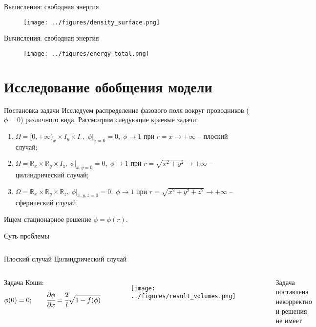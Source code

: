 \documentclass[aspectratio=169]{beamer}
\begin{document}
\begin{frame}{Вычисления: свободная энергия}
\vspace{-0.6cm}
\begin{figure}
	\texttt{[image: ../figures/density\_surface.png]}
\end{figure}
\end{frame}


\begin{frame}{Вычисления: свободная энергия}
\vspace{-0.6cm}
\begin{figure}
	\texttt{[image: ../figures/energy\_total.png]}
\end{figure}
\end{frame}


\section{Исследование обобщения модели}

\begin{frame}{Постановка задачи}
Исследуем распределение фазового поля вокруг проводников ($\phi = 0$) различного вида. Рассмотрим
следующие краевые задачи:
\begin{enumerate}
	\item $\Omega = [0, +\infty)_x \times I_y \times I_z, \; \phi|_{x = 0} = 0, \; \phi \to 1$ при
	$r = x \to +\infty$ -- плоский случай;
	\item $\Omega = \mathbb{R}_x \times \mathbb{R}_y \times I_z, \; \phi|_{x, y = 0} = 0, \;
	\phi \to 1$ при $r = \sqrt{x^2 + y^2} \to +\infty$ -- \\ цилиндрический случай;
	\item $\Omega = \mathbb{R}_x \times \mathbb{R}_y \times \mathbb{R}_z, \;
	\phi|_{x, y, z = 0} = 0, \; \phi \to 1$ при $r = \sqrt{x^2 + y^2 + z^2} \to +\infty$ -- \\
	сферический случай.
\end{enumerate}
Ищем стационарное решение $\phi = \phi(r)$.
\end{frame}


\begin{frame}{Суть проблемы}
\begin{columns}
\centering
Плоский случай
\centering
Цилиндрический случай
\end{columns}
\vspace{0.5cm}
\begin{columns}
Задача Коши:
\vspace{-0.3cm}
$$\phi(0) = 0; \qquad \cfrac{\partial \phi}{\partial x} = \cfrac{2}{l} \sqrt{1 - f(\phi)}$$
\begin{figure}
	\texttt{[image: ../figures/result\_volumes.png]}
\end{figure}
\rule{0.4pt}{0.7\textheight}
\centering
Задача поставлена некорректно \\ и решения не имеет \cite{zipunova_higher_codimension}
\end{columns}
\end{frame}
\end{document}
